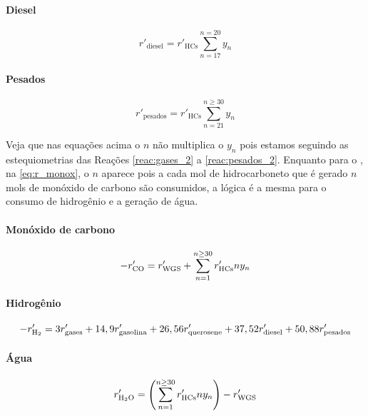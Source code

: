 \documentclass[portuguese,12pt,a4paper,onecolumn]{article}
\begin{document}
	\paragraph{Diesel}
	\begin{equation}
		r'_\mathrm{diesel} = r'_\mathrm{ HCs } \sum_{n=17}^{n=20} y_n
	\end{equation}
	
	\paragraph{Pesados}
	\begin{equation}
		r'_\mathrm{pesados} = r'_\mathrm{ HCs } \sum_{n=21}^{n \geq 30} y_n
	\end{equation}
	
	Veja que nas equações acima o $n$ não multiplica o $y_n$ pois estamos seguindo as estequiometrias das Reações \ref{reac:gases_2} a \ref{reac:pesados_2}. Enquanto para o , na \autoref{eq:r_monox}, o $n$ aparece pois a cada mol de hidrocarboneto que é gerado $n$ mols de monóxido de carbono são consumidos, a lógica é a mesma para o consumo de hidrogênio e a geração de água.
	
	\paragraph{Monóxido de carbono}
	\begin{equation}
		- r_{\ce{CO}}' = r_{\mathrm{WGS}}' + \sum_{n=1}^{n \geq 30} r_{\mathrm{HCs}}' n y_n
		\label{eq:r_monox}
	\end{equation}
	
	\paragraph{Hidrogênio}
	\begin{equation}
		-r_{\ce{H2}}' = 3 r'_\mathrm{gases} + 14,9 r'_\mathrm{gasolina} + 26,56 r'_\mathrm{querosene} + 37,52 r'_\mathrm{diesel} + 50,88 r'_\mathrm{pesados}
		\label{eq:r_H2_simple_2}
	\end{equation}
	
	\paragraph{Água}
	\begin{equation}
		r_{\ce{H2O}}' =  \left(\sum_{n=1}^{n \geq 30} r_{\mathrm{HCs}}' n y_n\right) - r_{\mathrm{WGS}}'
	\end{equation}
	
\end{document}
